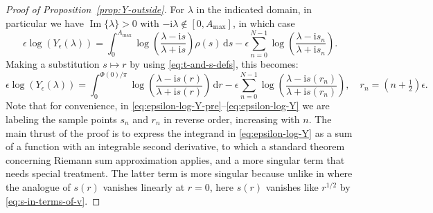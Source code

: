 \documentclass[12pt]{amsart}
\numberwithin{equation}{section}
\newcommand{\dd}{\mathrm{d}}
\newcommand{\ii}{\mathrm{i}}
\newcommand{\SP}{\lambda}
\newcommand{\phaseint}{\Phi}
\newcommand{\rr}{r}
\DeclareMathOperator{\imag}{Im}
\begin{document}
\begin{proof}[Proof of Proposition~\ref{prop:Y-outside}]
\label{proof:Y-outside}
\hypertarget{proof-Y-outside}{For} $\SP$ in the indicated domain, in particular we have $\imag\{\SP\}>0$ with $-\ii\SP\not\in [0,A_\mathrm{max}]$, in which case
\begin{equation}
\epsilon\log(Y_\epsilon(\SP)) = \int_0^{A_\mathrm{max}}\log\left(\frac{\SP-\ii s}{\SP+\ii s}\right)\rho(s)\,\dd s-\epsilon\sum_{n=0}^{N-1}
\log\left(\frac{\SP-\ii s_n}{\SP+\ii s_n}\right).
\label{eq:epsilon-log-Y-pre}
\end{equation}
Making a substitution $s\mapsto \rr$ by using \eqref{eq:t-and-s-defs}, this becomes:
\begin{equation}
\epsilon\log(Y_\epsilon(\SP))=\int_0^{\phaseint(0)/\pi}\log\left(\frac{\SP-\ii s(\rr)}{\SP+\ii s(\rr)}\right)\,\dd \rr-\epsilon\sum_{n=0}^{N-1}\log\left(\frac{\SP-\ii s(\rr_n)}{\SP+\ii s(\rr_n)}\right),\quad \rr_n=(n+\tfrac{1}{2})\epsilon.
\label{eq:epsilon-log-Y}
\end{equation}
Note that for convenience, in \eqref{eq:epsilon-log-Y-pre}--\eqref{eq:epsilon-log-Y} we are labeling the sample points $s_n$ and $\rr_n$ in reverse order, increasing with $n$.  The main thrust of the proof is to express the integrand in \eqref{eq:epsilon-log-Y} as a sum of a function with an integrable second derivative, to which a standard theorem concerning Riemann sum approximation applies, and a more singular term that needs special treatment.  The latter term is more singular because unlike in \cite{BaikKMM07} where the analogue of $s(\rr)$ vanishes linearly at $\rr=0$, here $s(\rr)$ vanishes like $\rr^{1/2}$ by \eqref{eq:s-in-terms-of-v}.


\end{proof}
\end{document}
